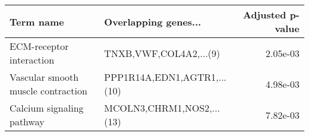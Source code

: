 \begin{tabular}{llr}
\toprule
                         Term name &        Overlapping genes... &  Adjusted p-value \\
\midrule
          ECM-receptor interaction &      TNXB,VWF,COL4A2,...(9) &          2.05e-03 \\
Vascular smooth muscle contraction & PPP1R14A,EDN1,AGTR1,...(10) &          4.98e-03 \\
         Calcium signaling pathway &   MCOLN3,CHRM1,NOS2,...(13) &          7.82e-03 \\
\bottomrule
\end{tabular}
